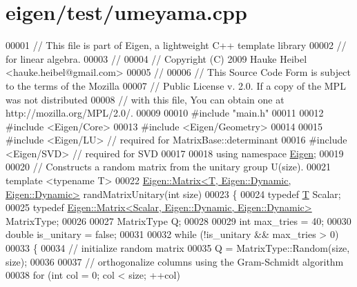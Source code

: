 \hypertarget{eigen_2test_2umeyama_8cpp_source}{}\section{eigen/test/umeyama.cpp}
\label{eigen_2test_2umeyama_8cpp_source}

\begin{DoxyCode}
00001 \textcolor{comment}{// This file is part of Eigen, a lightweight C++ template library}
00002 \textcolor{comment}{// for linear algebra.}
00003 \textcolor{comment}{//}
00004 \textcolor{comment}{// Copyright (C) 2009 Hauke Heibel <hauke.heibel@gmail.com>}
00005 \textcolor{comment}{//}
00006 \textcolor{comment}{// This Source Code Form is subject to the terms of the Mozilla}
00007 \textcolor{comment}{// Public License v. 2.0. If a copy of the MPL was not distributed}
00008 \textcolor{comment}{// with this file, You can obtain one at http://mozilla.org/MPL/2.0/.}
00009 
00010 \textcolor{preprocessor}{#include "main.h"}
00011 
00012 \textcolor{preprocessor}{#include <Eigen/Core>}
00013 \textcolor{preprocessor}{#include <Eigen/Geometry>}
00014 
00015 \textcolor{preprocessor}{#include <Eigen/LU>} \textcolor{comment}{// required for MatrixBase::determinant}
00016 \textcolor{preprocessor}{#include <Eigen/SVD>} \textcolor{comment}{// required for SVD}
00017 
00018 \textcolor{keyword}{using namespace }\hyperlink{namespace_eigen}{Eigen};
00019 
00020 \textcolor{comment}{//  Constructs a random matrix from the unitary group U(size).}
00021 \textcolor{keyword}{template} <\textcolor{keyword}{typename} T>
00022 \hyperlink{group___core___module_class_eigen_1_1_matrix}{Eigen::Matrix<T, Eigen::Dynamic, Eigen::Dynamic>} 
      randMatrixUnitary(\textcolor{keywordtype}{int} size)
00023 \{
00024   \textcolor{keyword}{typedef} \hyperlink{group___sparse_core___module}{T} Scalar;
00025   \textcolor{keyword}{typedef} \hyperlink{group___core___module_class_eigen_1_1_matrix}{Eigen::Matrix<Scalar, Eigen::Dynamic, Eigen::Dynamic>}
       MatrixType;
00026 
00027   MatrixType Q;
00028 
00029   \textcolor{keywordtype}{int} max\_tries = 40;
00030   \textcolor{keywordtype}{double} is\_unitary = \textcolor{keyword}{false};
00031 
00032   \textcolor{keywordflow}{while} (!is\_unitary && max\_tries > 0)
00033   \{
00034     \textcolor{comment}{// initialize random matrix}
00035     Q = MatrixType::Random(size, size);
00036 
00037     \textcolor{comment}{// orthogonalize columns using the Gram-Schmidt algorithm}
00038     \textcolor{keywordflow}{for} (\textcolor{keywordtype}{int} col = 0; col < size; ++col)

\end{DoxyCode}
